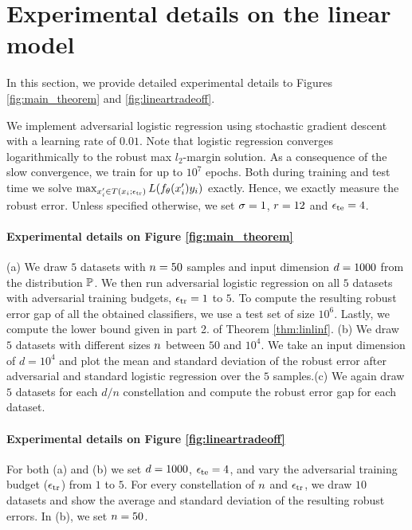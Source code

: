 \section{Experimental details on the linear model}

\label{sec:logregapp}
In this section, we provide detailed experimental details to Figures \ref{fig:main_theorem} and \ref{fig:lineartradeoff}.

We implement adversarial logistic regression using stochastic gradient descent with a learning rate of $0.01$. Note that logistic regression converges logarithmically to the robust max $l_2$-margin solution. As a consequence of the slow convergence, we train for up to $10^7$ epochs. Both during training and test time we solve $\max_{x_i' \in T({x_i};{\epsilon_{\text{tr}}})} L(f_\theta(x_i') y_i)$ exactly. Hence, we exactly measure the robust error. %
Unless specified otherwise, we set $\sigma= 1$,  $r = 12$ and $\epsilon_{\text{te}} = 4$. 

\paragraph{Experimental details on Figure \ref{fig:main_theorem}} (a) We draw $5$ datasets with $n= 50$ samples and input dimension $d=1000$ from the distribution $\mathbb{P}$. We then run adversarial logistic regression on all $5$ datasets with adversarial training budgets, $\epsilon_{\text{tr}} = 1$ to $5$. To compute the resulting robust error gap of all the obtained classifiers, we use a test set of size $10^{6}$. Lastly, we compute the lower bound given in part 2. of Theorem \ref{thm:linlinf}. (b) We draw $5$ datasets with different sizes $n$ between $50$ and $10^4$. We take an input dimension of $d = 10^4$ and plot the mean and standard deviation of the robust error after adversarial and standard logistic regression over the $5$ samples.(c) We again draw $5$ datasets for each $d/n$ constellation and compute the robust error gap for each dataset.

\paragraph{Experimental details on Figure \ref{fig:lineartradeoff}} For both (a) and (b) we set $d = 1000$, $\epsilon_{\text{te}} = 4$, and vary the adversarial training budget ($\epsilon_{\text{tr}}$) from $1$ to $5$. For every constellation of $n$ and $\epsilon_{\text{tr}}$, we draw $10$ datasets and show the average and standard deviation of the resulting robust errors. In (b), we set $n = 50$.

